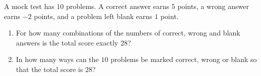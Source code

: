 A mock test has $10$ problems. A correct answer earns $5$ points, a wrong answer earns $-2$ points, and a problem left blank earns $1$ point.
\begin{enumerate}
\item[(a)] For how many combinations of the numbers of correct, wrong and blank answers is the total score exactly $28$?
\item[(b)] In how many ways can the $10$ problems be marked correct, wrong or blank so that the total score is $28$?
\end{enumerate}

